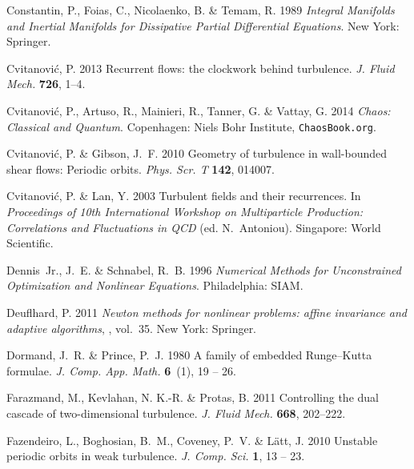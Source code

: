 \documentclass{jfm}
\begin{document}
\begin{thebibliography}{73}
{\sc Constantin, P., Foias, C., Nicolaenko, B. \& Temam, R.} 1989 {\em Integral
  Manifolds and Inertial Manifolds for Dissipative Partial Differential
  Equations\/}. New York: Springer.

{\sc Cvitanovi{\'c}, P.} 2013 Recurrent flows: the clockwork behind turbulence.
  {\em J. Fluid Mech.\/} {\bf 726}, 1--4.

{\sc Cvitanovi\'{c}, P., Artuso, R., Mainieri, R., Tanner, G. \& Vattay, G.}
  2014 {\em Chaos: Classical and Quantum\/}. Copenhagen: Niels Bohr Institute,
  {\tt ChaosBook.org}.

{\sc Cvitanovi{\'c}, P. \& Gibson, J.~F.} 2010 Geometry of turbulence in
  wall-bounded shear flows: {Periodic} orbits. {\em Phys. Scr. T\/} {\bf 142},
  014007.

{\sc Cvitanovi\'{c}, P. \& Lan, Y.} 2003 Turbulent fields and their
  recurrences. In {\em Proceedings of 10th International Workshop on
  Multiparticle Production: Correlations and Fluctuations in QCD\/} (ed.
  N.~Antoniou). Singapore: World Scientific.

{\sc Dennis~Jr., J.~E. \& Schnabel, R.~B.} 1996 {\em Numerical Methods for
  Unconstrained Optimization and Nonlinear Equations\/}. Philadelphia: SIAM.

{\sc Deuflhard, P.} 2011 {\em Newton methods for nonlinear problems: affine
  invariance and adaptive algorithms\/}, , vol.~35. New York: Springer.

{\sc Dormand, J.~R. \& Prince, P.~J.} 1980 A family of embedded
  {R}unge--{K}utta formulae. {\em J. Comp. App. Math.\/} {\bf 6}~(1), 19 -- 26.

{\sc Farazmand, M., Kevlahan, N. K.-R. \& Protas, B.} 2011 Controlling the dual
  cascade of two-dimensional turbulence. {\em J. Fluid Mech.\/} {\bf 668},
  202--222.

{\sc Fazendeiro, L., Boghosian, B.~M., Coveney, P.~V. \& L{\"a}tt, J.} 2010
  Unstable periodic orbits in weak turbulence. {\em J. Comp. Sci.\/} {\bf 1},
  13 -- 23.


\end{thebibliography}
\end{document}

